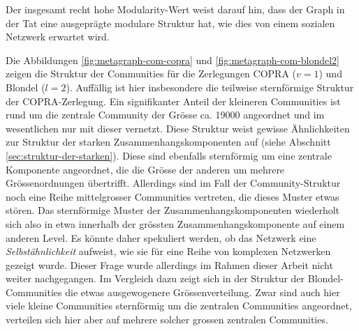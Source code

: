 Der insgesamt recht hohe Modularity-Wert weist darauf hin, dass der
Graph in der Tat eine ausgepr\"agte modulare Struktur hat, wie dies
von einem sozialen Netzwerk erwartet wird.

Die Abbildungen \ref{fig:metagraph-com-copra} und
\ref{fig:metagraph-com-blondel2} zeigen die Struktur der Communities
f\"ur die Zerlegungen COPRA ($v=1$) und Blondel ($l=2$). Auff\"allig
ist hier insbesondere die teilweise sternf\"ormige Struktur der
COPRA-Zerlegung. Ein signifikanter Anteil der kleineren Communities
ist rund um die zentrale Community der Gr\"osse ca. 19000 angeordnet
und im wesentlichen nur mit dieser vernetzt. Diese Struktur weist
gewisse \"Ahnlichkeiten zur Struktur der starken
Zusammenhangskomponenten auf (siehe Abschnitt
\ref{sec:struktur-der-starken}). Diese sind ebenfalls sternf\"ormig um
eine zentrale Komponente angeordnet, die die Gr\"osse der anderen um
mehrere Gr\"ossenordnungen \"ubertrifft. Allerdings sind im Fall der
Community-Struktur noch eine Reihe mittelgrosser Communities
vertreten, die dieses Muster etwas st\"oren. Das sternf\"ormige Muster
der Zusammenhangskomponenten wiederholt sich also in etwa innerhalb
der gr\"ossten Zusammenhangskomponente auf einem anderen Level. Es
k\"onnte daher spekuliert werden, ob das Netzwerk eine
\emph{Selbst\"ahnlichkeit} aufweist, wie sie f\"ur eine Reihe von
komplexen Netzwerken gezeigt wurde\cite{Song2005}. Dieser Frage wurde
allerdings im Rahmen dieser Arbeit nicht weiter nachgegangen. Im
Vergleich dazu zeigt sich in der Struktur der Blondel-Communities die
etwas ausgewogenere Gr\"ossenverteilung. Zwar sind auch hier viele
kleine Communities sternf\"ormig um die zentralen Communities
angeordnet, verteilen sich hier aber auf mehrere solcher grossen
zentralen Communities.

